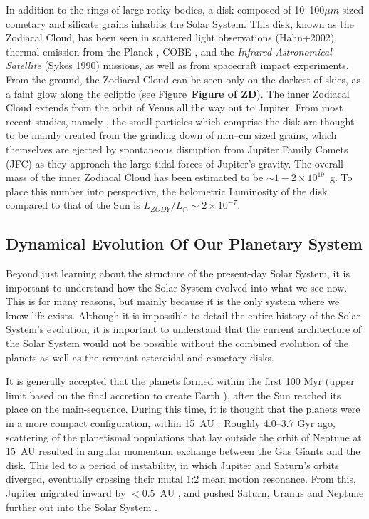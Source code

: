     
    
    In addition to the rings of large rocky bodies, a disk composed of 10--100$\mu m$ sized cometary and silicate grains inhabits the Solar System. This disk, known as the Zodiacal Cloud, has been seen in scattered light observations (Hahn+2002), thermal emission from the Planck \citep{Maris2006}, COBE \citep{Kelsall1998}, and the \textit{Infrared Astronomical Satellite} (Sykes 1990) missions, as well as from spacecraft impact experiments. From the ground, the Zodiacal Cloud can be seen only on the darkest of skies, as a faint glow along the ecliptic (see Figure~\textbf{Figure of ZD}). The inner Zodiacal Cloud extends from the orbit of Venus all the way out to Jupiter. From most recent studies, namely \citet{Nesvorny2010}, the small particles which comprise the disk are thought to be mainly created from the grinding down of mm--cm sized grains, which themselves are ejected by spontaneous disruption from Jupiter Family Comets (JFC) as they approach the large tidal forces of Jupiter's gravity. The overall mass of the inner Zodiacal Cloud has been estimated to be $\sim1-2\times10^{19}$~g. To place this number into perspective, the bolometric Luminosity of the disk compared to that of the Sun is $L_{ZODY}/L_\odot \sim 2\times10^{-7}$. 


    
    \subsection{Dynamical Evolution Of Our Planetary System}\label{sec:solar_system}
    
    Beyond just learning about the structure of the present-day Solar System, it is important to understand how the Solar System evolved into what we see now. This is for many reasons, but mainly because it is the only system where we know life exists. Although it is impossible to detail the entire history of the Solar System's evolution, it is important to understand that the current architecture of the Solar System would not be possible without the combined evolution of the planets as well as the remnant asteroidal and cometary disks. 
    
    It is generally accepted that the planets formed within the first 100 Myr (upper limit based on the final accretion to create Earth \citep{Allegre2008}), after the Sun reached its place on the main-sequence. During this time, it is thought that the planets were in a more compact configuration, within 15~AU \citep{Batygin2010}. Roughly 4.0--3.7 Gyr ago, scattering of the planetismal populations that lay outside the orbit of Neptune at 15~AU resulted in angular momentum exchange between the Gas Giants and the disk. This led to a period of instability, in which Jupiter and Saturn's orbits diverged, eventually crossing their mutal 1:2 mean motion resonance. From this, Jupiter migrated inward by $<0.5$~AU \citep{Morbidelli2010}, and pushed Saturn, Uranus and Neptune further out into the Solar System \citep{Tsiganis2005}. 
    
